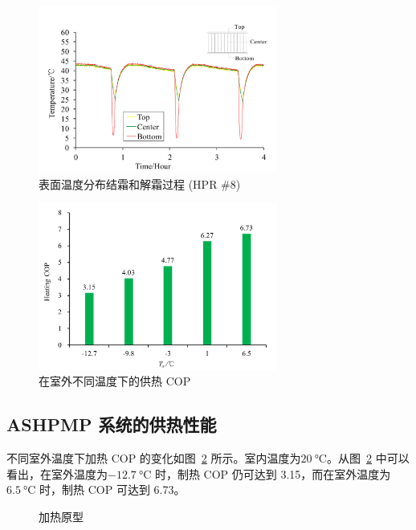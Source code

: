 \begin{figure}[htbp]
	\centering
	\includegraphics[width=0.7\textwidth]{picture/picture_13}
	\caption{表面温度分布结霜和解霜过程 (HPR \#8)}
	\label{F:13}
\end{figure}

\begin{figure}[htbp]
	\centering
	\includegraphics[width=0.7\textwidth]{picture/picture_14}
	\caption{在室外不同温度下的供热 COP}
	\label{F:14}
\end{figure}

\subsection{ASHPMP 系统的供热性能}
不同室外温度下加热 COP 的变化如图~\ref{F:14} 所示。室内温度为$\qty{20}{\degreeCelsius} $。从图~\ref{F:14} 中可以看出，在室外温度为$\qty{-12.7}{\degreeCelsius}$ 时，制热 COP 仍可达到 3.15，而在室外温度为$\qty{6.5}{\degreeCelsius} $ 时，制热 COP 可达到 6.73。

\begin{figure}[h]
\centering  %
\caption{加热原型}
\label{F:15}
\end{figure}

